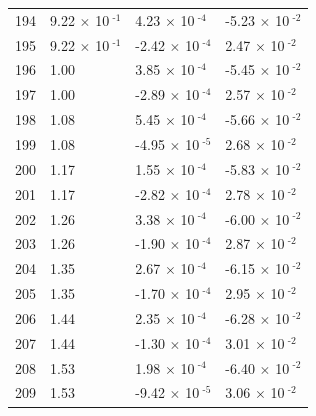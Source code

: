 \documentclass[a4paper,11pt]{article}
\begin{document}
\begin{center}
\begin{longtable}{|R{1.5cm}|R{2.5cm}|R{2.5cm}|R{2.5cm}|}
  194 &         9.22 $\times$ 10$^{\text{          -1}}$  &         4.23 $\times$ 10$^{\text{          -4}}$  &        -5.23 $\times$ 10$^{\text{          -2}}$ \\ 
  195 &         9.22 $\times$ 10$^{\text{          -1}}$  &        -2.42 $\times$ 10$^{\text{          -4}}$  &         2.47 $\times$ 10$^{\text{          -2}}$ \\ 
  196 &   1.00  &         3.85 $\times$ 10$^{\text{          -4}}$  &        -5.45 $\times$ 10$^{\text{          -2}}$ \\ 
  197 &   1.00  &        -2.89 $\times$ 10$^{\text{          -4}}$  &         2.57 $\times$ 10$^{\text{          -2}}$ \\ 
  198 &   1.08  &         5.45 $\times$ 10$^{\text{          -4}}$  &        -5.66 $\times$ 10$^{\text{          -2}}$ \\ 
  199 &   1.08  &        -4.95 $\times$ 10$^{\text{          -5}}$  &         2.68 $\times$ 10$^{\text{          -2}}$ \\ 
  200 &   1.17  &         1.55 $\times$ 10$^{\text{          -4}}$  &        -5.83 $\times$ 10$^{\text{          -2}}$ \\ 
  201 &   1.17  &        -2.82 $\times$ 10$^{\text{          -4}}$  &         2.78 $\times$ 10$^{\text{          -2}}$ \\ 
  202 &   1.26  &         3.38 $\times$ 10$^{\text{          -4}}$  &        -6.00 $\times$ 10$^{\text{          -2}}$ \\ 
  203 &   1.26  &        -1.90 $\times$ 10$^{\text{          -4}}$  &         2.87 $\times$ 10$^{\text{          -2}}$ \\ 
  204 &   1.35  &         2.67 $\times$ 10$^{\text{          -4}}$  &        -6.15 $\times$ 10$^{\text{          -2}}$ \\ 
  205 &   1.35  &        -1.70 $\times$ 10$^{\text{          -4}}$  &         2.95 $\times$ 10$^{\text{          -2}}$ \\ 
  206 &   1.44  &         2.35 $\times$ 10$^{\text{          -4}}$  &        -6.28 $\times$ 10$^{\text{          -2}}$ \\ 
  207 &   1.44  &        -1.30 $\times$ 10$^{\text{          -4}}$  &         3.01 $\times$ 10$^{\text{          -2}}$ \\ 
  208 &   1.53  &         1.98 $\times$ 10$^{\text{          -4}}$  &        -6.40 $\times$ 10$^{\text{          -2}}$ \\ 
  209 &   1.53  &        -9.42 $\times$ 10$^{\text{          -5}}$  &         3.06 $\times$ 10$^{\text{          -2}}$ \\ 

\end{longtable}
\end{center}
\end{document}
